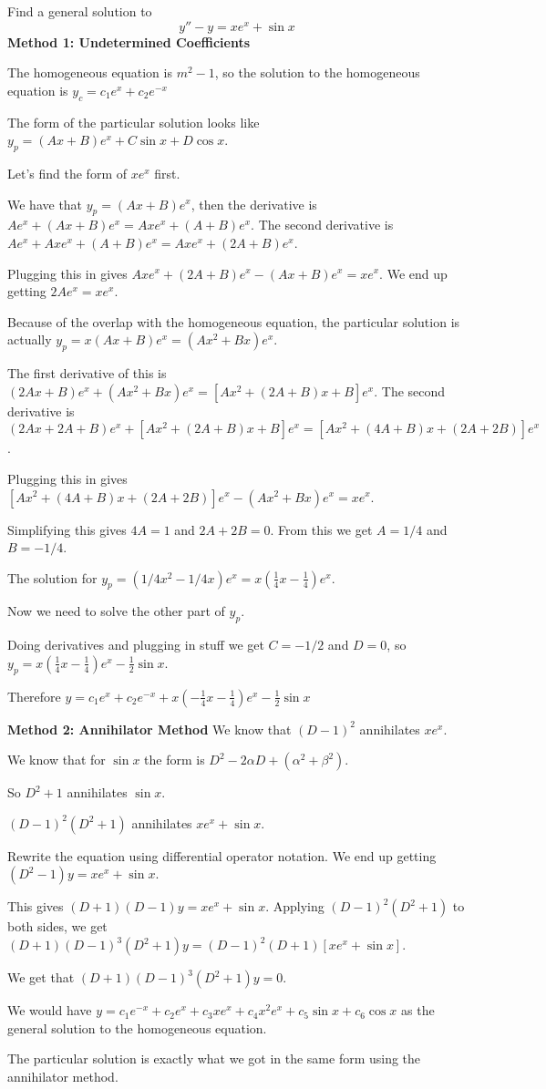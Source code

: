 \documentclass[../diffeq.tex]{subfiles}
\begin{document}
\pagebreak
\begin{example}
    Find a general solution to 
    \[ y''-y=xe^x+\sin x \]
    \textbf{Method 1: Undetermined Coefficients} 

    The homogeneous equation is $m^2-1$, so the solution to the homogeneous equation is $y_c=c_1e^x+c_2e^{-x}$

    The form of the particular solution looks like $y_p=(Ax+B)e^x + C\sin x + D\cos x$.

    Let's find the form of $xe^x$ first. 

    We have that $y_p=(Ax+B)e^x$, then the derivative is $Ae^x+(Ax+B)e^x=Axe^x+(A+B)e^x$. The second derivative is $Ae^x+Axe^x+(A+B)e^x= Axe^x+(2A+B)e^x$.

    Plugging this in gives $Axe^x+(2A+B)e^x-(Ax+B)e^x=xe^x$. We end up getting $2Ae^x=xe^x$.

    Because of the overlap with the homogeneous equation, the particular solution is actually $y_p=x(Ax+B)e^x=(Ax^2+Bx)e^x$.

    The first derivative of this is $(2Ax+B)e^x+(Ax^2+Bx)e^x = [Ax^2+(2A+B)x+B]e^x$. The second derivative is $(2Ax+2A+B)e^x+[Ax^2+(2A+B)x+B]e^x = [Ax^2+(4A+B)x+(2A+2B)]e^x$.

    Plugging this in gives $[Ax^2+(4A+B)x+(2A+2B)]e^x-(Ax^2+Bx)e^x=xe^x$.

    Simplifying this gives $4A=1$ and $2A+2B=0$. From this we get $A=1/4$ and $B=-1/4$.

    The solution for $y_p=(1/4 x^2-1/4x)e^x=x(\frac{1}{4}x-\frac{1}{4})e^x$.

    Now we need to solve the other part of $y_p$.

    Doing derivatives and plugging in stuff we get $C=-1/2$ and $D=0$, so $y_p=x(\frac{1}{4}x-\frac{1}{4})e^x-\frac{1}{2}\sin x$.

    Therefore $y = c_1e^x+c_2e^{-x}+x(-\frac{1}{4}x-\frac{1}{4})e^x-\frac{1}{2}\sin x$

    \textbf{Method 2: Annihilator Method}
    We know that $(D-1)^2$ annihilates $xe^x$.

    We know that for $\sin x$ the form is $D^2-2\alpha D+(\alpha^2+\beta^2)$.

    So $D^2+1$ annihilates $\sin x$.

    $(D-1)^2(D^2+1)$ annihilates $xe^x+\sin x$.

    Rewrite the equation using differential operator notation. We end up getting $(D^2-1)y=xe^x+\sin x$.

    This gives $(D+1)(D-1)y=xe^x+\sin x$. Applying $(D-1)^2(D^2+1)$ to both sides, we get $(D+1)(D-1)^3(D^2+1)y=(D-1)^2(D+1)[xe^x+\sin x]$.

    We get that $(D+1)(D-1)^3(D^2+1)y=0$.

    We would have $y=c_1e^{-x}+c_2e^x+c_3xe^x+c_4x^2e^x+c_5\sin x+c_6\cos x$ as the general solution to the homogeneous equation. 

    The particular solution is exactly what we got in the same form using the annihilator method.
\end{example}
\end{document}
